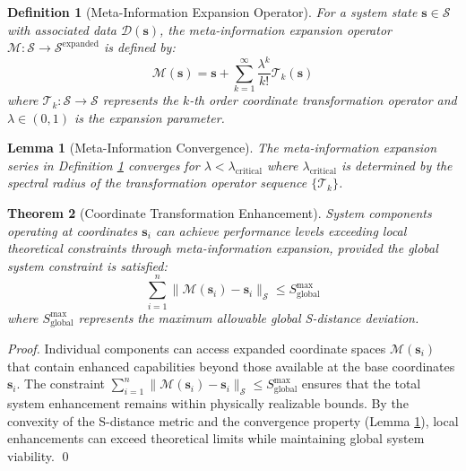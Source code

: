 \documentclass[12pt,a4paper]{article}
\newtheorem{theorem}{Theorem}
\newtheorem{lemma}[theorem]{Lemma}
\newtheorem{definition}{Definition}
\begin{document}
\begin{definition}[Meta-Information Expansion Operator]
\label{def:meta_info_expansion}
For a system state $\mathbf{s} \in \mathcal{S}$ with associated data $\mathcal{D}(\mathbf{s})$, the meta-information expansion operator $\mathcal{M}: \mathcal{S} \to \mathcal{S}^{\text{expanded}}$ is defined by:
\begin{equation}
\mathcal{M}(\mathbf{s}) = \mathbf{s} + \sum_{k=1}^{\infty} \frac{\lambda^k}{k!} \mathcal{T}_k(\mathbf{s})
\end{equation}
where $\mathcal{T}_k: \mathcal{S} \to \mathcal{S}$ represents the $k$-th order coordinate transformation operator and $\lambda \in (0,1)$ is the expansion parameter.
\end{definition}

\begin{lemma}[Meta-Information Convergence]
\label{lem:meta_info_convergence}
The meta-information expansion series in Definition \ref{def:meta_info_expansion} converges for $\lambda < \lambda_{\text{critical}}$ where $\lambda_{\text{critical}}$ is determined by the spectral radius of the transformation operator sequence $\{\mathcal{T}_k\}$.
\end{lemma}

\begin{theorem}[Coordinate Transformation Enhancement]
\label{thm:coord_transform_enhancement}
System components operating at coordinates $\mathbf{s}_i$ can achieve performance levels exceeding local theoretical constraints through meta-information expansion, provided the global system constraint is satisfied:
\begin{equation}
\sum_{i=1}^n \|\mathcal{M}(\mathbf{s}_i) - \mathbf{s}_i\|_{\mathcal{S}} \leq S_{\text{global}}^{\text{max}}
\end{equation}
where $S_{\text{global}}^{\text{max}}$ represents the maximum allowable global S-distance deviation.
\end{theorem}

\begin{proof}
Individual components can access expanded coordinate spaces $\mathcal{M}(\mathbf{s}_i)$ that contain enhanced capabilities beyond those available at the base coordinates $\mathbf{s}_i$. The constraint $\sum_{i=1}^n \|\mathcal{M}(\mathbf{s}_i) - \mathbf{s}_i\|_{\mathcal{S}} \leq S_{\text{global}}^{\text{max}}$ ensures that the total system enhancement remains within physically realizable bounds. By the convexity of the S-distance metric and the convergence property (Lemma \ref{lem:meta_info_convergence}), local enhancements can exceed theoretical limits while maintaining global system viability. \qed
\end{proof}
\end{document}
